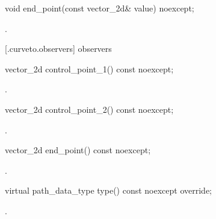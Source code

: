 \begin{itemdecl}
    void end_point(const vector_2d& value) noexcept;
\end{itemdecl}
\begin{itemdescr}
	\pnum
	\postconditions
	.
	
\end{itemdescr}

 [\iotwod.curveto.observers]{ observers}

\begin{itemdecl}
    vector_2d control_point_1() const noexcept;
\end{itemdecl}
\begin{itemdescr}
	\pnum
	\returns
	.

\end{itemdescr}

\begin{itemdecl}
    vector_2d control_point_2() const noexcept;
\end{itemdecl}
\begin{itemdescr}
	\pnum
	\returns
	.

\end{itemdescr}

\begin{itemdecl}
    vector_2d end_point() const noexcept;
\end{itemdecl}
\begin{itemdescr}
	\pnum
	\returns
	.

\end{itemdescr}

\begin{itemdecl}
    virtual path_data_type type() const noexcept override;
\end{itemdecl}
\begin{itemdescr}
	\pnum
	\returns
	.

\end{itemdescr}
